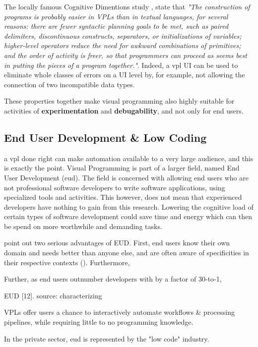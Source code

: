 The locally famous Cognitive Dimentions study \cite{green_usability_1996}, state that \emph{"The construction of programs is probably easier in VPLs than in textual languages, for several reasons: 
there are fewer syntactic planning goals to be met, such as paired delimiters, discontinuous constructs, separators, or initializations of variables; 
higher-level operators reduce the need for awkward combinations of primitives; 
and the order of activity is freer, so that programmers can proceed as seems best in putting the pieces of a program together."}. 
Indeed, a vpl UI can be used to eliminate whole classes of errors on a UI level by, for example, not allowing the connection of two incompatible data types. 

These properties together make visual programming also highly suitable for activities of \textbf{experimentation} and \textbf{debugability}, and not only for end users. 

\subsection*{End User Development \& Low Coding}
a \ac{vpl} done right can make automation available to a very large audience, and this is exactly the point. 
Visual Programming is part of a larger field, named End User Development (eud). 
The field is concerned with allowing end users who are not professional software developers to write software applications, using specialized tools and activities. 
This however, does not mean that experienced developers have nothing to gain from this research. 
Lowering the cognitive load of certain types of software development could save time and energy which can then be spend on more worthwhile and demanding tasks. 

\cite{kuhail_characterizing_2021} point out two serious advantages of EUD. 
First, end users know their own domain and needs better than anyone else, and are often aware of specificities in their respective contexts (\cite{kuhail_characterizing_2021}). 
Furthermore, 

Further, as end users outnumber developers with  by a factor of 30-to-1, 

EUD  [12].
source: characterizing

VPLs offer users a chance to interactively automate workflows \& processing pipelines, while requiring little to no programming knowledge. 

In the private sector, \ac{eud} is represented by the "low code" industry. 

